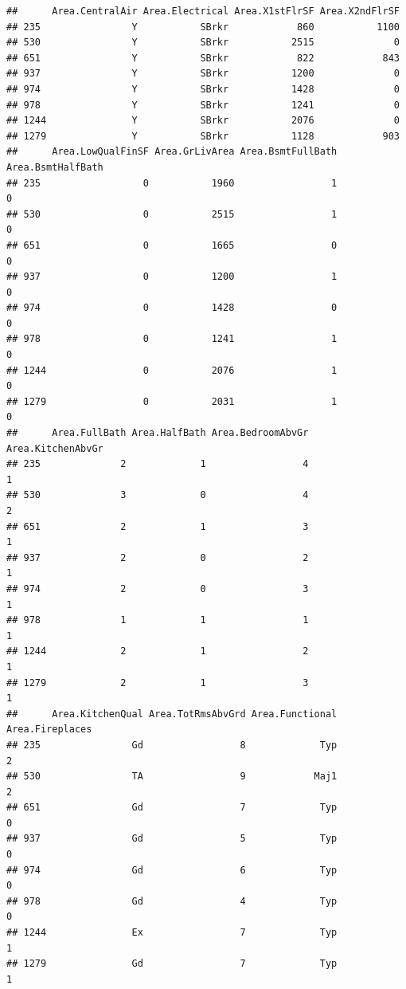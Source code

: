 \documentclass[]{article}
\begin{document}
\begin{verbatim}
##      Area.CentralAir Area.Electrical Area.X1stFlrSF Area.X2ndFlrSF
## 235                Y           SBrkr            860           1100
## 530                Y           SBrkr           2515              0
## 651                Y           SBrkr            822            843
## 937                Y           SBrkr           1200              0
## 974                Y           SBrkr           1428              0
## 978                Y           SBrkr           1241              0
## 1244               Y           SBrkr           2076              0
## 1279               Y           SBrkr           1128            903
##      Area.LowQualFinSF Area.GrLivArea Area.BsmtFullBath Area.BsmtHalfBath
## 235                  0           1960                 1                 0
## 530                  0           2515                 1                 0
## 651                  0           1665                 0                 0
## 937                  0           1200                 1                 0
## 974                  0           1428                 0                 0
## 978                  0           1241                 1                 0
## 1244                 0           2076                 1                 0
## 1279                 0           2031                 1                 0
##      Area.FullBath Area.HalfBath Area.BedroomAbvGr Area.KitchenAbvGr
## 235              2             1                 4                 1
## 530              3             0                 4                 2
## 651              2             1                 3                 1
## 937              2             0                 2                 1
## 974              2             0                 3                 1
## 978              1             1                 1                 1
## 1244             2             1                 2                 1
## 1279             2             1                 3                 1
##      Area.KitchenQual Area.TotRmsAbvGrd Area.Functional Area.Fireplaces
## 235                Gd                 8             Typ               2
## 530                TA                 9            Maj1               2
## 651                Gd                 7             Typ               0
## 937                Gd                 5             Typ               0
## 974                Gd                 6             Typ               0
## 978                Gd                 4             Typ               0
## 1244               Ex                 7             Typ               1
## 1279               Gd                 7             Typ               1

\end{verbatim}
\end{document}
